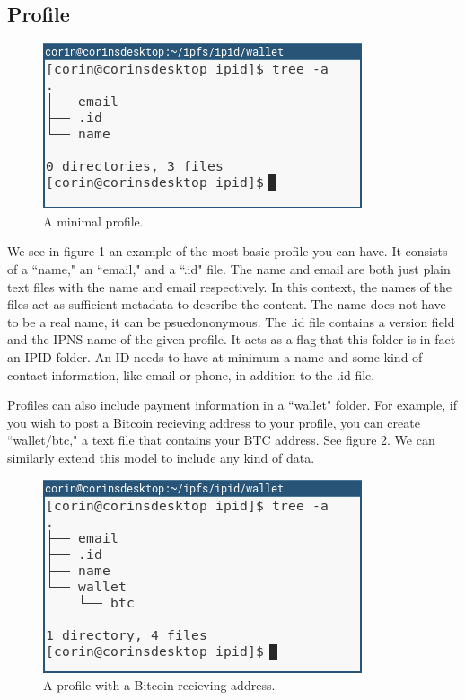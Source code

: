 \documentclass{article}
\begin{document}
\subsection{Profile}

\begin{figure}[h]
  \centering
  \includegraphics[width=.5\textwidth]{resources/basic_profile.png}
  \caption{A minimal profile.}
\end{figure}

We see in figure 1 an example of the most basic profile you can have. It consists of a ``name," an ``email," and a ``.id" file. The name and email are both just plain text files with the name and email respectively. In this context, the names of the files act as sufficient metadata to describe the content. The name does not have to be a real name, it can be psuedononymous. The .id file contains a version field and the IPNS name of the given profile. It acts as a flag that this folder is in fact an IPID folder. An ID needs to have at minimum a name and some kind of contact information, like email or phone, in addition to the .id file. \par
Profiles can also include payment information in a ``wallet" folder. For example, if you wish to post a Bitcoin recieving address to your profile, you can create ``wallet/btc," a text file that contains your BTC address. See figure 2. We can similarly extend this model to include any kind of data.

\begin{figure}[h]
  \centering
  \includegraphics[width=.5\textwidth]{resources/basic_profile_wallet.png}
  \caption{A profile with a Bitcoin recieving address.}
\end{figure}
\end{document}
